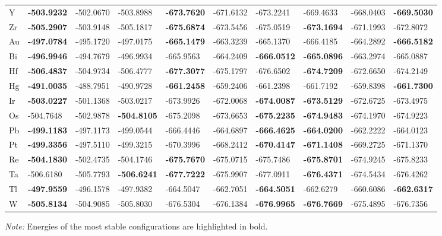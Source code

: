 \documentclass[a4paper, 12pt]{article}
\begin{document}
\begin{table}[htbp]
{\begin{tabular}{l *{9}{l}}
      Y  & \textbf{-503.9232} & -502.0670 & -503.8988 & \textbf{-673.7620} & -671.6132 & -673.2241 & -669.4633 & -668.0403 & \textbf{-669.5030} \\
      Zr & \textbf{-505.2907} & -503.9148 & -505.1817 & \textbf{-675.6874} & -673.5456 & -675.0519 & \textbf{-673.1694} & -671.1993 & -672.8072 \\
      Au & \textbf{-497.0784} & -495.1720 & -497.0175 & \textbf{-665.1479} & -663.3239 & -665.1370 & -666.4185 & -664.2892 & \textbf{-666.5182} \\
      Bi & \textbf{-496.9946} & -494.7679 & -496.9934 & -665.9563 & -664.2409 & \textbf{-666.0512} & \textbf{-665.0896} & -663.2974 & -665.0887 \\
      Hf & \textbf{-506.4837} & -504.9734 & -506.4777 & \textbf{-677.3077} & -675.1797 & -676.6502 & \textbf{-674.7209} & -672.6650 & -674.2149 \\
      Hg & \textbf{-491.0035} & -488.7951 & -490.9728 & \textbf{-661.2458} & -659.2406 & -661.2398 & -661.7192 & -659.8398 & \textbf{-661.7300} \\
      Ir & \textbf{-503.0227} & -501.1368 & -503.0217 & -673.9926 & -672.0068 & \textbf{-674.0087} & \textbf{-673.5129} & -672.6725 & -673.4975 \\
      Os & -504.7648 & -502.9878 & \textbf{-504.8105} & -675.2098 & -673.6653 & \textbf{-675.2235} & \textbf{-674.9483} & -674.1970 & -674.9223 \\
      Pb & \textbf{-499.1183} & -497.1173 & -499.0544 & -666.4446 & -664.6897 & \textbf{-666.4625} & \textbf{-664.0200} & -662.2222 & -664.0123 \\
      Pt & \textbf{-499.3356} & -497.5110 & -499.3215 & -670.3996 & -668.2412 & \textbf{-670.4147} & \textbf{-671.1408} & -669.2725 & -671.1370 \\
      Re & \textbf{-504.1830} & -502.4735 & -504.1746 & \textbf{-675.7670} & -675.0715 & -675.7486 & \textbf{-675.8701} & -674.9245 & -675.8233 \\
      Ta & -506.6180 & -505.7793 & \textbf{-506.6241} & \textbf{-677.7222} & -675.9907 & -677.0911 & \textbf{-676.4371} & -674.5434 & -676.4262 \\
      Tl & \textbf{-497.9559} & -496.1578 & -497.9382 & -664.5047 & -662.7051 & \textbf{-664.5051} & -662.6279 & -660.6086 & \textbf{-662.6317}\\
      W  & \textbf{-505.8134} & -504.9085 & -505.8030 & -676.5304 & -676.1384 & \textbf{-676.9965} & \textbf{-676.7669} & -675.4895 & -676.7356 \\
      \bottomrule
    \end{tabular}
  }

  \smallskip

  \footnotesize\textit{Note:} Energies of the most stable configurations are highlighted in bold.
\end{table}
\end{document}
